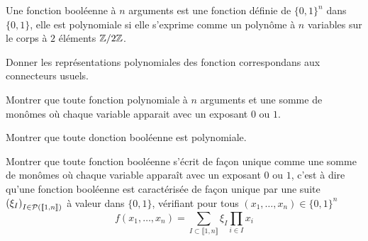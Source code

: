 \documentclass[french]{report}
\begin{document}
\begin{exo}
    Une fonction booléenne à \(n\) arguments est une fonction définie de \(\{0,1\}^n\)
    dans \(\{0,1\}\), elle est polynomiale si elle s'exprime comme un polynôme à \(n\)
    variables sur le corps à \(2\) éléments \(\Z/2\Z\).
    \begin{q}{1}
        Donner les représentations polynomiales des fonction correspondans aux connecteurs usuels.
    \end{q}
    \begin{q}{2}
        Montrer que toute fonction polynomiale à \(n\) arguments et une somme de monômes
        où chaque variable apparait avec un exposant \(0\) ou \(1\).
    \end{q}
    \begin{q}{3}
        Montrer que toute donction booléenne est polynomiale.
    \end{q}
    \begin{q}{4}
        Montrer que toute fonction booléenne s'écrit de façon unique comme une somme
        de monômes où chaque variable apparaît avec un exposant \(0\) ou \(1\), c'est
        à dire qu'une fonction booléenne est caractérisée de façon unique par une suite
        \(\left(\xi_I\right)_{I\in\pow[\llbracket1,n\rrbracket]}\) à valeur dans
        \(\{0,1\}\), vérifiant pour tous \((x_1,\dots,x_n)\in \{0,1\}^n\)
        \[f(x_1,\dots,x_n)=\sum _{I\subset\llbracket1,n\rrbracket}\xi_I\prod_{i\in I}x_i\]
    \end{q}
\end{exo}
\end{document}
